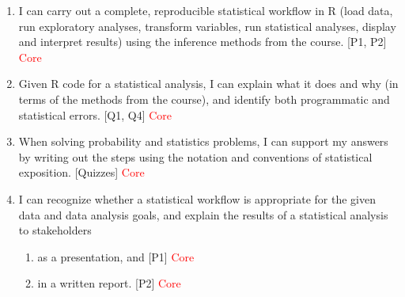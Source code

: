 \documentclass[12pt]{article}
\begin{document}
\begin{enumerate}
    \item I can carry out a complete, reproducible statistical workflow in R (load data, run exploratory analyses, transform variables, run statistical analyses, display and interpret results) using the inference methods from the course. [P1, P2] \textcolor{red}{Core} 
    \item Given R code for a statistical analysis, I can explain what it does and why (in terms of the methods from the course), and identify both programmatic and statistical errors. [Q1, Q4] \textcolor{red}{Core} 
    \item When solving probability and statistics problems, I can support my answers by writing out the steps using the notation and conventions of statistical exposition. [Quizzes] \textcolor{red}{Core} 
    \item I can recognize whether a statistical workflow is appropriate for the given data and data analysis goals, and explain the results of a statistical analysis to stakeholders
    \begin{enumerate}
        \item as a presentation, and [P1] \textcolor{red}{Core} 
        \item in a written report. [P2] \textcolor{red}{Core}
    \end{enumerate}    
\end{enumerate}

\end{document}
